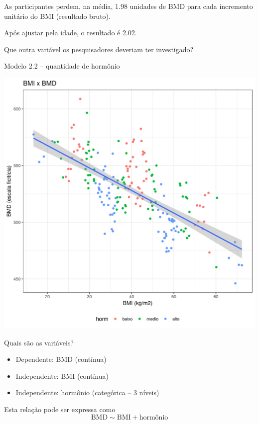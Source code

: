 \documentclass{beamer}
\begin{document}
\begin{frame}{\scriptsize }
  \begin{block}{}
    \footnotesize
    As participantes perdem, na média, 1.98 unidades de BMD para cada incremento unitário do BMI (resultado bruto).

    \bigskip
    Após ajustar pela idade, o resultado é 2.02.
  \end{block}
\end{frame}

\begin{frame}{\scriptsize }
  \begin{center}
    Que outra variável os pesquisadores deveriam ter investigado?
  \end{center}
\end{frame}

\begin{frame}{\scriptsize Modelo 2.2 -- quantidade de hormônio}
  \begin{center}
    \includegraphics[height=.9\textheight]{Cap31-32/pratica-rlm2_2}
  \end{center}
\end{frame}

\begin{frame}{\scriptsize Quais são as variáveis?}
  \begin{itemize}
  \item Dependente: BMD (contínua)
  \item Independente: BMI (contínua)
  \item Independente: hormônio (categórica -- 3 níveis)
  \end{itemize}
  \vfill
  \begin{block}{Esta relação pode ser expressa como}
    \footnotesize
    \begin{displaymath}
      \text{BMD} \sim \text{BMI} + \text{hormônio}
    \end{displaymath}
  \end{block}
\end{frame}
\end{document}
